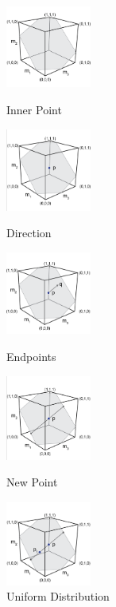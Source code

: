 \begin{figure}[ht]
   \begin{center}
    \includegraphics[width=0.25\textwidth]{HR1.png}
      \caption{Inner Point}
      \label{fig_hr1}
    \includegraphics[width=0.25\textwidth]{HR2.png}
    \caption{Direction}
      \label{fig_hr2}
    \includegraphics[width=0.25\textwidth]{HR3.png}
    \caption{Endpoints}
      \label{fig_hr3}
    \includegraphics[width=0.25\textwidth]{HR4.png}
    \caption{New Point}
      \label{fig_hr4}
  \end{center}
\end{figure}

\begin{figure}[ht]
   \begin{center}
    \includegraphics[width=0.25\textwidth]{HR5.png}
      \caption{Uniform Distribution}
      \label{fig_hr5}
  \end{center}
\end{figure}


